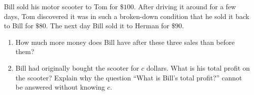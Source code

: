 Bill sold his motor scooter to Tom for $\$100$. After driving it around for a few days, Tom discovered it was in such a broken-down condition that he sold it back to Bill for $\$80$. The next day Bill sold it to Herman for $\$90$.
\begin{enumerate}
\item[(a)] How much more money does Bill have after these three sales than before them?
\item[(b)] Bill had originally bought the scooter for $c$ dollars. What is his total profit on the scooter? Explain why the question ``What is Bill's total profit?'' cannot be answered without knowing $c$.
\end{enumerate}
